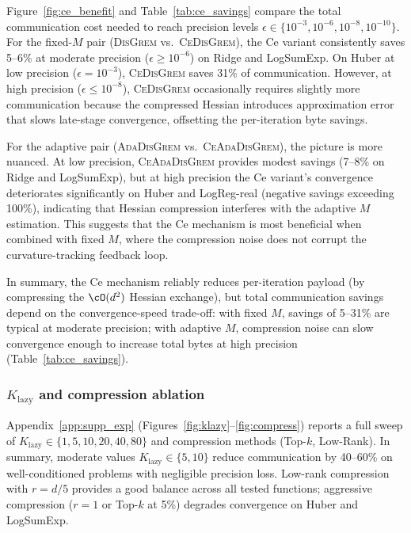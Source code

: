 \documentclass[review,onefignum,onetabnum]{siamart171218}
\begin{document}
	Figure~\ref{fig:ce_benefit} and Table~\ref{tab:ce_savings} compare
	the total communication cost needed to reach precision levels $\epsilon\in\{10^{-3},10^{-6},10^{-8},10^{-10}\}$.
	For the fixed-$M$ pair (\textsc{DisGrem} vs.\ \textsc{CeDisGrem}), the Ce variant
	consistently saves 5--6\% at moderate precision ($\epsilon \ge 10^{-6}$)
	on Ridge and LogSumExp.
	On Huber at low precision ($\epsilon{=}10^{-3}$), \textsc{CeDisGrem} saves
	31\% of communication.
	However, at high precision ($\epsilon \le 10^{-8}$), \textsc{CeDisGrem}
	occasionally requires slightly more communication because the
	compressed Hessian introduces approximation error that slows late-stage
	convergence, offsetting the per-iteration byte savings.
	
	For the adaptive pair (\textsc{AdaDisGrem} vs.\ \textsc{CeAdaDisGrem}), the picture is
	more nuanced.
	At low precision, \textsc{CeAdaDisGrem} provides modest savings (7--8\% on
	Ridge and LogSumExp), but at high precision the Ce variant's
	convergence deteriorates significantly on Huber and LogReg-real
	(negative savings exceeding 100\%), indicating that Hessian
	compression interferes with the adaptive $M$ estimation.
	This suggests that the Ce mechanism is most beneficial when combined
	with fixed $M$, where the compression noise does not corrupt the
	curvature-tracking feedback loop.

	In summary, the Ce mechanism reliably reduces
	per-iteration payload (by compressing the $\cO(d^2)$
	Hessian exchange), but total communication savings depend on
	the convergence-speed trade-off: with fixed $M$, savings of
	5--31\% are typical at moderate precision; with adaptive $M$,
	compression noise can slow convergence enough to increase
	total bytes at high precision (Table~\ref{tab:ce_savings}).

	\subsubsection{$K_{\mathrm{lazy}}$ and compression ablation}

	Appendix~\ref{app:supp_exp} (Figures~\ref{fig:klazy}--\ref{fig:compress})
	reports a full sweep of $K_{\mathrm{lazy}}\in\{1,5,10,20,40,80\}$
	and compression methods (Top-$k$, Low-Rank).
	In summary, moderate values $K_{\mathrm{lazy}}\in\{5,10\}$ reduce
	communication by 40--60\% on well-conditioned problems with
	negligible precision loss.
	Low-rank compression with $r{=}d/5$ provides a good balance
	across all tested functions; aggressive compression ($r{=}1$ or
	Top-$k$ at 5\%) degrades convergence on Huber and LogSumExp.
	
\end{document}
